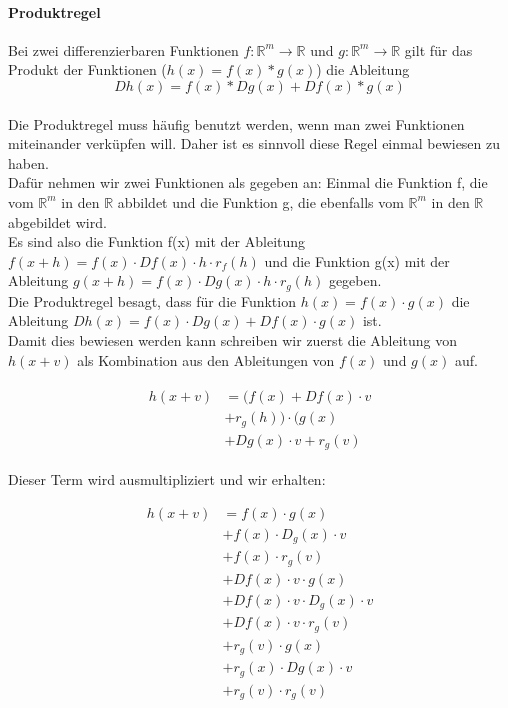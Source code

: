 \paragraph{Produktregel}
Bei zwei differenzierbaren Funktionen $f:\mathds{R}^m\rightarrow\mathds{R}$ und $g:\mathds{R}^m\rightarrow\mathds{R}$ gilt für das Produkt der Funktionen ($h(x)=f(x)*g(x)$) die Ableitung \begin{equation*}Dh(x)=f(x)*Dg(x)+Df(x)*g(x)\end{equation*}
\\
Die Produktregel muss häufig benutzt werden, wenn man zwei Funktionen miteinander verküpfen will. Daher ist es sinnvoll diese Regel einmal bewiesen zu haben.
 \\
Dafür nehmen wir zwei Funktionen als gegeben an: Einmal die Funktion f, die vom $\mathds{R}^m$ in den $\mathds{R}$ abbildet und die Funktion g, die ebenfalls vom $\mathds{R}^m$ in den $\mathds{R}$ abgebildet wird. \\
Es sind also die Funktion f(x) mit der Ableitung $f(x+h) = f(x) \cdot Df(x) \cdot h \cdot r_{f}(h)$ und die Funktion g(x) mit der Ableitung $g(x+h) = f(x) \cdot Dg(x) \cdot h \cdot r_{g}(h)$ gegeben. \\
Die Produktregel besagt, dass für die Funktion $h(x) = f(x) \cdot g(x)$ die Ableitung $Dh(x) = f(x) \cdot Dg(x) + Df(x) \cdot g(x)$ %
 ist. \\
Damit dies bewiesen werden kann schreiben wir zuerst die Ableitung von $h(x+v)$ als Kombination aus den Ableitungen von $f(x)$ und $g(x)$ auf.

\begin{align} \begin{split} h(x+v) & = (f(x) + Df(x) \cdot v \\ & + r_{g}(h)) \cdot (g(x) \\ & + Dg(x) \cdot v + r_{g}(v) \end{split} \end{align}

Dieser Term wird ausmultipliziert und wir erhalten: 

\begin{equation*}
\begin{split} h(x+v) & = f(x) \cdot g(x) \\ & + f(x)  \cdot D_{g}(x) \cdot v \\ & + f(x) \cdot r_{g}(v) \\ & + Df(x) \cdot v \cdot g(x) \\ & +  Df(x) \cdot v \cdot D_{g}(x) \cdot v  \\ & + Df(x) \cdot v \cdot r_{g}(v) \\ & +  r_{g}(v) \cdot g(x) \\ & + r_{g}(x) \cdot Dg(x) \cdot v \\ & + r_{g}(v) \cdot r_{g}(v) \end{split} \end{equation*}   %


